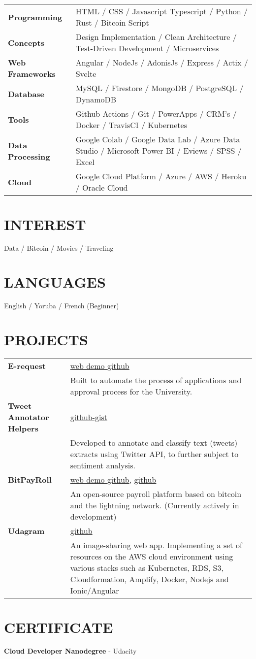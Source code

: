 \documentclass[a4paper,12pt]{article}
\begin{document}
\begin{tabularx}{\linewidth}{@{}l X@{}}
\textbf{Programming} & HTML / CSS / Javascript Typescript / Python / Rust / Bitcoin Script \\
\textbf{Concepts} & Design Implementation / Clean Architecture / Test-Driven Development / Microservices \\
\textbf{Web Frameworks} & Angular / NodeJs / AdonisJs / Express / Actix / Svelte \\
\textbf{Database} & MySQL / Firestore / MongoDB / PostgreSQL / DynamoDB \\
\textbf{Tools} & Github Actions / Git / PowerApps / CRM's / Docker / TravisCI / Kubernetes \\
\textbf{Data Processing} & Google Colab / Google Data Lab / Azure Data Studio / Microsoft Power BI / Eviews / SPSS / Excel \\
\textbf{Cloud} & Google Cloud Platform / Azure / AWS / Heroku / Oracle Cloud
\end{tabularx}

\section{INTEREST}
Data / Bitcoin / Movies / Traveling

\section{LANGUAGES}
English / Yoruba / French (Beginner)

\section{PROJECTS}

\begin{tabularx}{\linewidth}{@{}l X@{}}
\textbf{E-request} & \hfill \href{https://web-demo-github.com}{web demo github} \\
& Built to automate the process of applications and approval process for the University. \\[10pt]
\textbf{Tweet Annotator Helpers} & \hfill \href{https://github-gist.com}{github-gist} \\
& Developed to annotate and classify text (tweets) extracts using Twitter API, to further subject to sentiment analysis. \\[10pt]
\textbf{BitPayRoll} & \hfill \href{https://web-demo-github.com}{web demo github}, \href{https://github.com}{github} \\
& An open-source payroll platform based on bitcoin and the lightning network. (Currently actively in development) \\[10pt]
\textbf{Udagram} & \hfill \href{https://github.com}{github} \\
& An image-sharing web app. Implementing a set of resources on the AWS cloud environment using various stacks such as Kubernetes, RDS, S3, Cloudformation, Amplify, Docker, Nodejs and Ionic/Angular
\end{tabularx}

\section{CERTIFICATE}
\textbf{Cloud Developer Nanodegree} - Udacity

\vfill
{}
\end{document}
